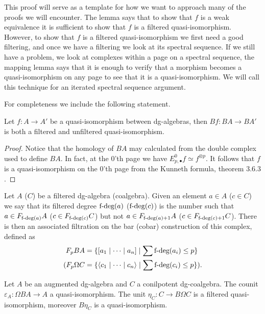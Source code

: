 \documentclass[../thesis.tex]{subfiles}
\begin{document}
            This proof will serve as a template for how we want to approach many of the proofs we will encounter. The lemma says that to show that $f$ is a weak equivalence it is sufficient to show that $f$ is a filtered quasi-isomorphism. However, to show that $f$ is a filtered quasi-isomorphism we first need a good filtering, and once we have a filtering we look at its spectral sequence. If we still have a problem, we look at complexes within a page on a spectral sequence, the mapping lemma says that it is enough to verify that a morphism becomes a quasi-isomorphism on any page to see that it is a quasi-isomorphism. We will call this technique for an iterated spectral sequence argument.

            For completeness we include the following statement.

            \begin{lemma}
                Let $f : A \rightarrow A'$ be a quasi-isomorphism between dg-algebras, then $Bf : BA \rightarrow BA'$ is both a filtered and unfiltered quasi-isomorphism.
            \end{lemma}

            \begin{proof}
                Notice that the homology of $BA$ may calculated from the double complex used to define $BA$. In fact, at the $0$'th page we have $E^0_{p, \bullet}f \simeq f^{\otimes p}$. It follows that $f$ is a quasi-isomorphism on the $0$'th page from the Kunneth formula, theorem 3.6.3 \cite{Weibel94}.            
            \end{proof}

            Let $A$ ($C$) be a filtered dg-algebra (coalgebra). Given an element $a\in A$ ($c\in C$) we say that its filtered degree $\tt{f-deg}(a)$ ($\tt{f-deg}(c)$) is the number such that $a\in F_{\tt{f-deg}(a)}A$ ($c\in F_{\tt{f-deg}(c)}C$) but not $a\in F_{\tt{f-deg}(a)+1}A$ ($c\in F_{\tt{f-deg}(c)+1}C$). There is then an associated filtration on the bar (cobar) construction of this complex, defined as 
            \begin{align*}
                F_pBA & = \startset{[ a_1 \mid \cdots \mid a_n ] \mid \sum \tt{f-deg}(a_i)\leq p} \\
                (F_p\Omega C & = \startset{\langle c_1 \mid \cdots \mid c_n \rangle \mid \sum \tt{f-deg}(c_i) \leq p})\tt{.}
            \end{align*}

            \begin{proposition}\label{prop: unit-counit-qif}
                Let $A$ be an augmented dg-algebra and $C$ a conilpotent dg-coalgebra. The counit $\varepsilon_A : \Omega BA \rightarrow A$ a quasi-isomorphism. The unit $\eta_C : C \rightarrow B\Omega C$ is a filtered quasi-isomorphism, moreover $B\eta_C$ is a quasi-isomorphism.
            \end{proposition}
\end{document}

